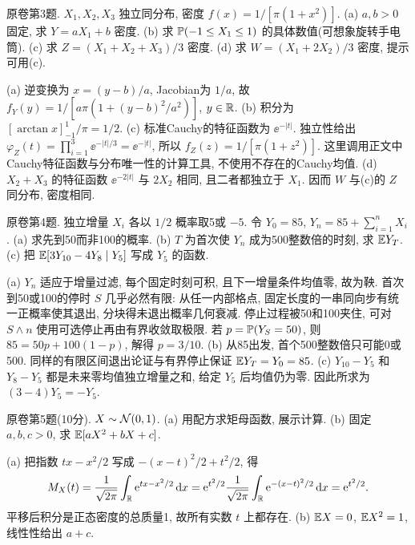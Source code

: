 \begin{exercise}\label{ex:fl17-3}
原卷第3题. $X_1,X_2,X_3$ 独立同分布, 密度 $f(x)=1/[\pi(1+x^2)]$. (a) $a,b>0$ 固定, 求 $Y=aX_1+b$ 密度. (b) 求 $\mathbb P(-1\leq X_1\leq1)$ 的具体数值(可想象旋转手电筒). (c) 求 $Z=(X_1+X_2+X_3)/3$ 密度. (d) 求 $W=(X_1+2X_2)/3$ 密度, 提示可用(c).
\end{exercise}
\begin{solution}
(a)\label{sol:fl17-3-a} 逆变换为 $x=(y-b)/a$, Jacobian为 $1/a$, 故 $f_Y(y)=1/[a\pi(1+(y-b)^2/a^2)]$, $y\in\mathbb R$.
(b)\label{sol:fl17-3-b} 积分为 $[\arctan x]_{-1}^1/\pi=1/2$.
(c)\label{sol:fl17-3-c} 标准Cauchy的特征函数为 $\ee^{-|t|}$. 独立性给出 $\varphi_Z(t)=\prod_{i=1}^3\ee^{-|t|/3}=\ee^{-|t|}$, 所以 $f_Z(z)=1/[\pi(1+z^2)]$. 这里调用正文中Cauchy特征函数与分布唯一性的计算工具, 不使用不存在的Cauchy均值.
(d)\label{sol:fl17-3-d} $X_2+X_3$ 的特征函数 $\ee^{-2|t|}$ 与 $2X_2$ 相同, 且二者都独立于 $X_1$. 因而 $W$ 与(c)的 $Z$ 同分布, 密度相同.
\end{solution}

\begin{exercise}\label{ex:fl17-4}
原卷第4题. 独立增量 $X_i$ 各以 $1/2$ 概率取5或 $-5$. 令 $Y_0=85$, $Y_n=85+\sum_{i=1}^nX_i$. (a) 求先到50而非100的概率. (b) $T$ 为首次使 $Y_n$ 成为500整数倍的时刻, 求 $\mathbb E Y_T$. (c) 把 $\mathbb E[3Y_{10}-4Y_8\mid Y_5]$ 写成 $Y_5$ 的函数.
\end{exercise}
\begin{solution}
(a)\label{sol:fl17-4-a} $Y_n$ 适应于增量过滤, 每个固定时刻可积, 且下一增量条件均值零, 故为鞅. 首次到50或100的停时 $S$ 几乎必然有限: 从任一内部格点, 固定长度的一串同向步有统一正概率使其退出, 分块得未退出概率几何衰减. 停止过程被50和100夹住, 可对 $S\wedge n$ 使用可选停止再由有界收敛取极限. 若 $p=\mathbb P(Y_S=50)$, 则 $85=50p+100(1-p)$, 解得 $p=3/10$.
(b)\label{sol:fl17-4-b} 从85出发, 首个500整数倍只可能0或500. 同样的有限区间退出论证与有界停止保证 $\mathbb E Y_T=Y_0=85$.
(c)\label{sol:fl17-4-c} $Y_{10}-Y_5$ 和 $Y_8-Y_5$ 都是未来零均值独立增量之和, 给定 $Y_5$ 后均值仍为零. 因此所求为 $(3-4)Y_5=-Y_5$.
\end{solution}

\begin{exercise}\label{ex:fl17-5}
原卷第5题(10分). $X\sim\mathcal N(0,1)$. (a) 用配方求矩母函数, 展示计算. (b) 固定 $a,b,c>0$, 求 $\mathbb E[aX^2+bX+c]$.
\end{exercise}
\begin{solution}
(a)\label{sol:fl17-5-a} 把指数 $tx-x^2/2$ 写成 $-(x-t)^2/2+t^2/2$, 得
\[M_X(t)=\frac1{\sqrt{2\pi}}\int_\mathbb R\mathrm e^{tx-x^2/2}\,\mathrm d x
=\mathrm e^{t^2/2}\frac1{\sqrt{2\pi}}\int_\mathbb R\mathrm e^{-(x-t)^2/2}\,\mathrm d x=\mathrm e^{t^2/2}.\]
平移后积分是正态密度的总质量1, 故所有实数 $t$ 上都存在.
(b)\label{sol:fl17-5-b} $\mathbb E X=0$, $\mathbb E X^2=1$, 线性性给出 $a+c$.
\end{solution}

